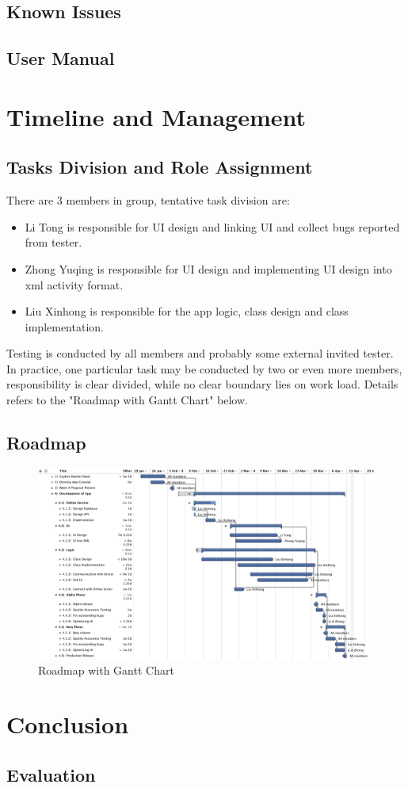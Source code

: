 \documentclass[10pt,a4paper,final]{scrartcl}
\begin{document}
\subsection{Known Issues}
	

\subsection{User Manual}
	

\section{Timeline and Management}
\subsection{Tasks Division and Role Assignment}
There are 3 members in group, tentative task division are: 
\begin{itemize}
\item Li Tong is responsible for UI design and linking UI and collect bugs reported from tester. 
\item Zhong Yuqing is responsible for UI design and implementing UI design into xml activity format. 
\item Liu Xinhong is responsible for the app logic, class design and class implementation. 
\end{itemize}
Testing is conducted by all members and probably some external invited tester.  
In practice, one particular task may be conducted by two or even more members, responsibility is clear divided, while no clear boundary lies on work load.  
Details refers to the "Roadmap with Gantt Chart" below. 
\subsection{Roadmap}
\begin{figure}[H]
\centering
\includegraphics[width=5.3in]{img/timetable.pdf}
\caption{Roadmap with Gantt Chart}
\end{figure}

\section{Conclusion}
\subsection{Evaluation}
	

\theendnotes
 
\end{document}
